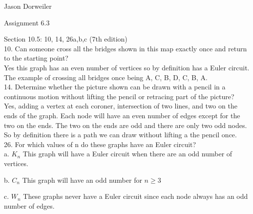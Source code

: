 \documentclass{article}
\begin{document}
Jason Dorweiler

Assignment 6.3

Section 10.5: 10, 14, 26a,b,c (7th edition)\\

10. Can someone cross all the bridges shown in this map exactly once and return to the
starting point?\\

Yes this graph has an even number of vertices so by definition has a Euler circuit. The example of crossing all bridges once being A, C, B, D, C, B, A. \\

14. Determine whether the picture shown can be drawn with a pencil in a continuous motion
without lifting the pencil or retracing part of the picture?\\

Yes, adding a vertex at each coroner, intersection of two lines, and two on the ends of the graph.  Each node will have an even number of edges except for the two on the ends.  The two on the ends are odd and there are only two odd nodes.  So by definition there is a path we can draw without lifting a the pencil once. \\

26. For which values of n do these graphs have an Euler circuit?\\

a. $K_n$ This graph will have a Euler circuit when there are an odd number of vertices. 

b. $C_n$  This graph will have an odd number for $n\geq3$

c. $W_n$ These graphs never have a Euler circuit since each node always has an odd number of edges. 
\end{document}
